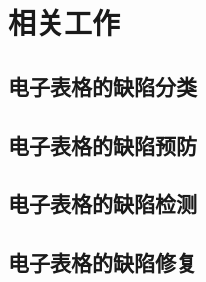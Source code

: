 \chapter{相关工作}

\section{电子表格的缺陷分类}


\section{电子表格的缺陷预防}


\section{电子表格的缺陷检测}


\section{电子表格的缺陷修复}%


